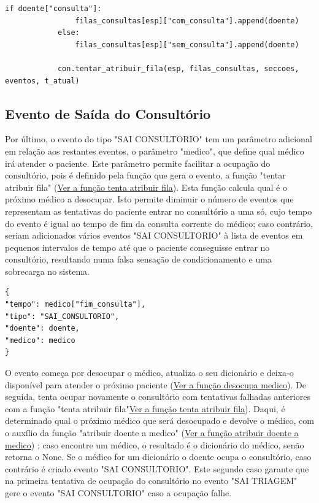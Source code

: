 \documentclass[12pt,a4paper]{article} %
\begin{document}
\begin{verbatim}    
if doente["consulta"]:
                filas_consultas[esp]["com_consulta"].append(doente)
            else:
                filas_consultas[esp]["sem_consulta"].append(doente)

            con.tentar_atribuir_fila(esp, filas_consultas, seccoes, eventos, t_atual)
\end{verbatim}

    \medskip
    \subsection{Evento de Saída do Consultório}
    \label{sec:sai_consultorio}

    \hypertarget{tenta_ocupar_consultorio}{}
    Por último, o evento do tipo "SAI CONSULTORIO" tem um parâmetro adicional em relação aos restantes eventos, o parâmetro "medico", que define qual médico irá atender o paciente. Este parâmetro permite facilitar a ocupação do consultório, pois é definido pela função que gera o evento, a função "tentar atribuir fila" (\hyperlink{tenta_atribuir_fila}{Ver a função tenta atribuir fila}).
     Esta função calcula qual é o próximo médico a desocupar. Isto permite diminuir o número de eventos que representam as tentativas do paciente entrar no consultório a uma só, cujo tempo do evento é igual ao tempo de fim da consulta corrente do médico; caso contrário, seriam adicionados vários eventos "SAI CONSULTORIO" à lista de eventos em pequenos intervalos de tempo até que o paciente conseguisse entrar no consultório, resultando numa falsa sensação de condicionamento e uma sobrecarga no sistema.

    \begin{verbatim}
{
"tempo": medico["fim_consulta"],
"tipo": "SAI_CONSULTORIO",
"doente": doente,
"medico": medico
}
    \end{verbatim}

    O evento começa por desocupar o médico, atualiza o seu dicionário e deixa-o disponível para atender o próximo paciente (\hyperlink{desocupa_medico}{Ver a função desocupa medico}).
    De seguida, tenta ocupar novamente o consultório com tentativas falhadas anteriores com a função "tenta atribuir fila"\hyperlink{tenta_atribui_fila}{Ver a função tenta atribuir fila}).
    Daqui, é determinado qual o próximo médico que será desocupado e devolve o médico, com o auxílio da função "atribuir doente a medico" (\hyperlink{atribuir_doente_a_medico}{Ver a função atribuir doente a medico})
    ; caso encontre um médico, o resultado é o dicionário do médico, senão retorna o None. Se o médico for um dicionário o doente ocupa o consultório, caso contrário é criado evento "SAI CONSULTORIO". Este segundo caso garante que na primeira tentativa de ocupação do consultório no evento "SAI TRIAGEM" gere o evento "SAI CONSULTORIO" caso a ocupação falhe.
\end{document}
